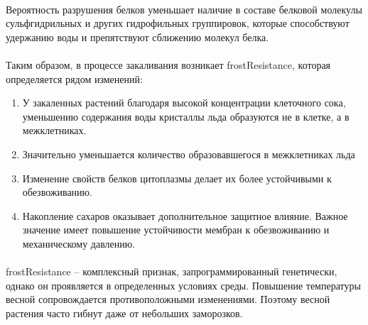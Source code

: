 \paragraph*{}Вероятность разрушения белков уменьшает наличие  в составе белковой молекулы сульфгидрильных и других гидрофильных группировок, которые способствуют удержанию воды и препятствуют сближению молекул белка. 



\paragraph*{}Таким образом, в процессе закаливания возникает \gls{frostResistance}, которая определяется рядом изменений: 

\begin{enumerate}
\item У закаленных растений благодаря высо­кой концентрации клеточного сока, уменьшению содержания воды кристаллы льда образуются не в клетке, а в межклетниках.
\item Значительно уменьшается количество образовавшегося в межклетниках льда
\item Изменение свойств белков цитоплазмы делает их более устойчивыми к обезвоживанию. 
\item Накопление сахаров оказывает дополнительное защитное влияние. Важное значение имеет повышение устойчивости мембран к обезвоживанию и механическому давлению.
\end{enumerate}
 
\paragraph*{}\gls{frostResistance} -- комплексный признак, запрограммированный генетически, однако он проявляется в определенных условиях среды. Повышение температуры весной сопровожда­ется противоположными изменениями. Поэтому весной растения часто гибнут даже от небольших заморозков. 

